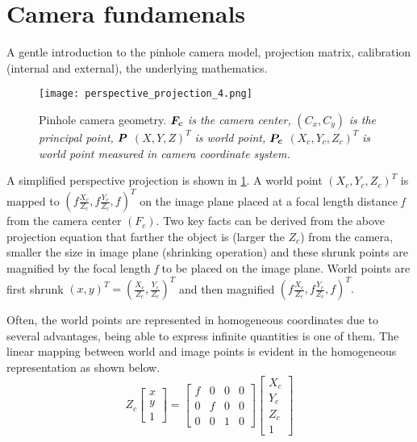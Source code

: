 \section{Camera fundamenals}
A gentle introduction to the pinhole camera model, projection matrix, calibration (internal and external), the underlying mathematics.

\begin{figure}[hbt!]
	\centering
	\texttt{[image: perspective\_projection\_4.png]}
	\caption{Pinhole camera geometry. $\bm{F_c}$ \textit{is the camera center,} \textbf{$(C_x, C_y)$} \textit{is the principal point,} $\bm{P}$ \((X, Y, Z)^T\)  \textit{is world point,} $\bm{P_c}$ \((X_c, Y_c, Z_c)^T\) \textit{is world point measured in camera coordinate system.\cite{OpenCV}} }
	\label{fig:perspective projection}
\end{figure}

A simplified perspective projection is shown in \cref{fig:perspective projection}. A world point \( \displaystyle (X_c, Y_c, Z_c)^T\)  is mapped to \( ( \textit{f}\frac{X_c}{Z_c}, \textit{f}\frac{Y_c}{Z_c}, \textit{f} )^T \) on the image plane placed at a focal length distance \textit{f} from the camera center $(F_c)$. Two key facts can be derived from the above projection equation that farther the object is (larger the $Z_c$) from the camera, smaller the size in image plane (shrinking operation) and these shrunk points are magnified by the focal length \textit{f} to be placed on the image plane. World points are first shrunk \( (x, y)^T =  (\frac{X_c}{Z_c}, \frac{Y_c}{Z_c})^T \) and then magnified \( ( \textit{f}\frac{X_c}{Z_c}, \textit{f}\frac{Y_c}{Z_c}, \textit{f} )^T.\)

Often, the world points are represented in homogeneous coordinates due to several advantages, being able to express infinite quantities is one of them. The linear mapping between world and image points is evident in the homogeneous representation as shown below.\\ 

\begin{equation}
Z_c \left[
\begin{array}{c} x\\ y\\ 1 \end{array} 
\right] = 
\begin{bmatrix}
\textit{f} & 0 & 0 & 0 \\
0 & \textit{f} & 0 & 0 \\
0 & 0 & 1 & 0
\end{bmatrix} 
\left[
\begin{array}{c} X_c\\ Y_c\\ Z_c\\ 1 \end{array} 
\right]
\label{eq:mat_image_t_camera}
\end{equation}

